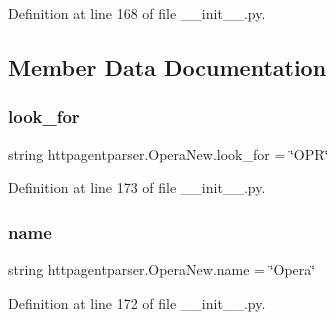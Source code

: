 Definition at line 168 of file \+\_\+\+\_\+init\+\_\+\+\_\+.\+py.



\subsection{Member Data Documentation}
\hypertarget{classhttpagentparser_1_1_opera_new_a8ff857658f0261bf79c88147a9c56662}{}\label{classhttpagentparser_1_1_opera_new_a8ff857658f0261bf79c88147a9c56662} 
\subsubsection{\texorpdfstring{look\+\_\+for}{look\_for}}
{\footnotesize\ttfamily string httpagentparser.\+Opera\+New.\+look\+\_\+for = \char`\"{}O\+PR\char`\"{}\hspace{0.3cm}{\ttfamily [static]}}



Definition at line 173 of file \+\_\+\+\_\+init\+\_\+\+\_\+.\+py.

\hypertarget{classhttpagentparser_1_1_opera_new_a28680b84cf8f9da80d744008c4d81f9f}{}\label{classhttpagentparser_1_1_opera_new_a28680b84cf8f9da80d744008c4d81f9f} 
\subsubsection{\texorpdfstring{name}{name}}
{\footnotesize\ttfamily string httpagentparser.\+Opera\+New.\+name = \char`\"{}Opera\char`\"{}\hspace{0.3cm}{\ttfamily [static]}}



Definition at line 172 of file \+\_\+\+\_\+init\+\_\+\+\_\+.\+py.

\hypertarget{classhttpagentparser_1_1_opera_new_af13982459db90db83d5c47339cb0e5ef}{}\label{classhttpagentparser_1_1_opera_new_af13982459db90db83d5c47339cb0e5ef} 
